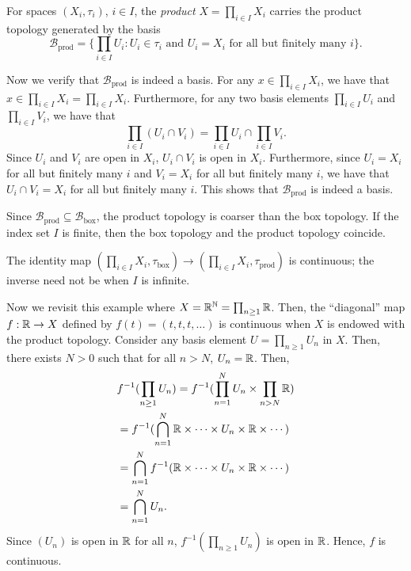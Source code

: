 \begin{definition}
For spaces $(X_i,{\tau}_i)$, $i\in I$, the \emph{product} $X=\prod_{i\in I} X_i$ carries the product topology generated by the basis
\[
\mathcal{B}_{\text{prod}}=\Big\{\prod_{i\in I} U_i : U_i\in{\tau}_i \text{ and } U_i=X_i \text{ for all but finitely many } i\Big\}.
\]
\end{definition}

Now we verify that $\mathcal{B}_{\text{prod}}$ is indeed a basis. For any $x\in \prod_{i\in I} X_i$, we have that $x\in \prod_{i\in I} X_i = \prod_{i\in I} X_i$. Furthermore, for any two basis elements $\prod_{i\in I} U_i$ and $\prod_{i\in I} V_i$, we have that
\[\prod_{i\in I} (U_i\cap V_i) =\prod_{i\in I} U_i \cap \prod_{i\in I} V_i.\]
Since $U_i$ and $V_i$ are open in $ X_i$, $U_i\cap V_i$ is open in $X_i$. Furthermore, since $U_i=X_i$ for all but finitely many $i$ and $V_i=X_i$ for all but finitely many $i$, we have that $U_i\cap V_i=X_i$ for all but finitely many $i$. This shows that $\mathcal{B}_{\text{prod}}$ is indeed a basis.

\begin{remark}
  Since $\mathcal{B}_{\text{prod}} \subseteq \mathcal{B}_{\text{box}}$, the product topology is coarser than the box topology. If the index set $I$ is finite, then the box topology and the product topology coincide.
\end{remark}



\begin{remark}
  The identity map $(\prod_{i\in I} X_i,{\tau}_{\text{box}})\to(\prod_{i\in I} X_i,{\tau}_{\text{prod}})$ is continuous; the inverse need not be when $I$ is infinite.
\end{remark}

\begin{example}
Now we revisit this example where $X=\mathbb{R}^{\mathbb{N}}=\prod_{n\ge1}\mathbb{R}$. Then, the ``diagonal'' map $f:\mathbb{R}\to X$ defined by $f(t)=(t,t,t,\ldots)$ is continuous when $X$ is endowed with the product topology. Consider any basis element $U=\prod_{n\ge1} U_n$ in $X$. Then, there exists $N>0$ such that for all $n>N$, $U_n=\mathbb{R}$. Then,
\begin{align*}
&f^{-1}(\prod_{n\ge1} U_n) = f^{-1}(\prod_{n=1}^N U_n \times \prod_{n>N} \mathbb{R})\\
&=f^{-1}(\bigcap_{n=1}^N \mathbb{R}\times\cdots\times U_n\times \mathbb{R}\times\cdots) \\
&= \bigcap_{n=1}^N f^{-1}(\mathbb{R}\times\cdots\times U_n\times \mathbb{R}\times\cdots)\\
&=\bigcap_{n=1}^N U_n.
\end{align*}
Since $(U_n)$ is open in $\mathbb{R}$ for all $n$, $f^{-1}(\prod_{n\ge1} U_n)$ is open in $\mathbb{R}$. Hence, $f$ is continuous.

\end{example}




